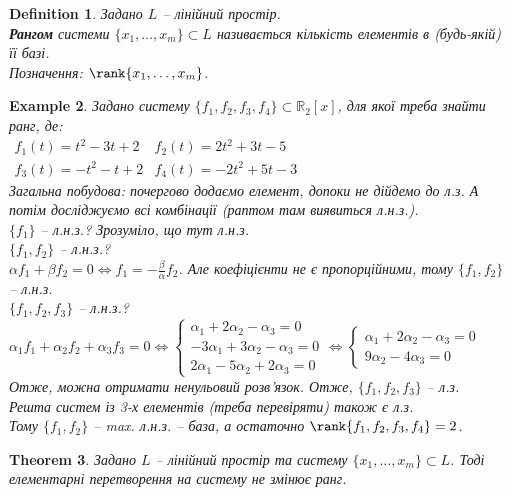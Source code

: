 \documentclass[a4paper, 10pt]{article}
\theoremstyle{theoremdd}
\newtheorem{theorem}{Theorem}[subsection]
\newtheorem{definition}[theorem]{Definition}
\newtheorem{example}[theorem]{Example}
\begin{document}
	\begin{definition}
	Задано $L$ -- лінійний простір.\\
	\textbf{Рангом} системи $\{x_1, \dots, x_m\} \subset L$ називається кількість елементів в (будь-якій) її базі.\\
	Позначення: $\rank\{x_1, \dots, x_m\}$.
	\end{definition}
	
	\begin{example}
	Задано систему $\{f_1, f_2, f_3, f_4\} \subset \mathbb{R}_2[x]$, для якої треба знайти ранг, де:\\
	$\begin{matrix}
	f_1(t) = t^2-3t+2 & f_2(t) = 2t^2+3t-5 \\
	f_3(t) = -t^2-t+2 & f_4(t) = -2t^2+5t-3
	\end{matrix}
	$\\
	Загальна побудова: почергово додаємо елемент, допоки не дійдемо до л.з. А потім досліджуємо всі комбінації (раптом там виявиться л.н.з.).\\
	$\{f_1\}$ -- л.н.з.? Зрозуміло, що тут л.н.з.\\
	$\{f_1, f_2 \}$ -- л.н.з.? \\ $\alpha f_1 + \beta f_2 = 0 \iff \displaystyle f_1 = -\frac{\beta}{\alpha}f_2$. Але коефіцієнти не є пропорційними, тому $\{f_1, f_2\}$ -- л.н.з.\\
	$\{f_1, f_2, f_3\}$ -- л.н.з.? \\
	$\alpha_1 f_1 + \alpha_2 f_2 + \alpha_3 f_3 = 0 \iff 
	\begin{cases}
	\alpha_1 + 2\alpha_2 - \alpha_3 = 0 \\
	-3\alpha_1 + 3\alpha_2 - \alpha_3 = 0 \\
	2\alpha_1 - 5\alpha_2 + 2\alpha_3 = 0
	\end{cases} \iff
	\begin{cases}
	\alpha_1 + 2\alpha_2 - \alpha_3 = 0 \\
	9\alpha_2 - 4\alpha_3 = 0
	\end{cases}
	$\\
	Отже, можна отримати ненульовий розв'язок. Отже, $\{f_1, f_2, f_3\}$ -- л.з.\\
	Решта систем із 3-х елементів (треба перевіряти) також є л.з.\\
	Тому $\{f_1, f_2\}$ -- max. л.н.з. -- база, а остаточно $\rank\{f_1, f_2, f_3, f_4 \} = 2$.
	\end{example}
	
	\begin{theorem}
	Задано $L$ -- лінійний простір та систему $\{x_1,\dots,x_m\} \subset L$. Тоді елементарні перетворення на систему не змінює ранг.
	\end{theorem}
	
\end{document}
